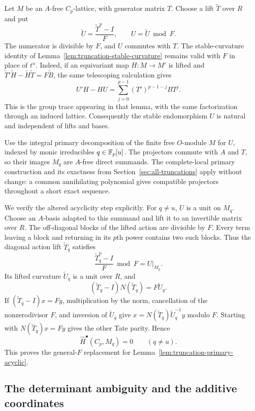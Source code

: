 Let $M$ be an $A$-free $C_p$-lattice, with generator matrix $T$.
Choose a lift $\widetilde T$ over $R$ and put
\[
 \widetilde U=\frac{\widetilde T^p-I}{F},\qquad
 U=\widetilde U\bmod F.
\]
The numerator is divisible by $F$, and $U$ commutes with $T$.
The stable-curvature identity of
Lemma~\ref{lem:truncation-stable-curvature} remains valid with $F$
in place of $t^n$.  Indeed, if an equivariant map $H:M\to M'$ is
lifted and
$\widetilde T'\widetilde H-\widetilde H\widetilde T=F\widetilde B$,
the same telescoping calculation gives
\begin{equation}\label{eq:monogenic-stable-curvature}
 U'H-HU=\sum_{j=0}^{p-1}(T')^{p-1-j}BT^j.
\end{equation}
This is the group trace appearing in that lemma, with the same
factorization through an induced lattice.  Consequently the stable
endomorphism $U$ is natural and independent of lifts and bases.

Use the integral primary decomposition of the finite free $O$-module
$M$ for $U$, indexed by monic irreducibles $q\in\mathbb F_p[u]$.
The projectors commute with $A$ and $T$, so their images $M_q$ are
$A$-free direct summands.  The complete-local primary construction and
its exactness from Section~\ref{sec:all-truncations} apply without
change: a common annihilating polynomial gives compatible projectors
throughout a short exact sequence.

We verify the altered acyclicity step explicitly.  For $q\ne u$,
$U$ is a unit on $M_q$.  Choose an $A$-basis adapted to this summand
and lift it to an invertible matrix over $R$.  The off-diagonal blocks
of the lifted action are divisible by $F$.  Every term leaving a
block and returning in its $p$th power contains two such blocks.
Thus the diagonal action lift $\widetilde T_q$ satisfies
\[
 \frac{\widetilde T_q^p-I}{F}\bmod F=U|_{M_q}.
\]
Its lifted curvature $\widetilde U_q$ is a unit over $R$, and
\begin{equation}\label{eq:monogenic-factorization}
 (\widetilde T_q-I)N(\widetilde T_q)=F\widetilde U_q.
\end{equation}
If $(\widetilde T_q-I)x=Fy$, multiplication by the norm, cancellation
of the nonzerodivisor $F$, and inversion of $\widetilde U_q$ give
$x=N(\widetilde T_q)\widetilde U_q^{-1}y$ modulo $F$.
Starting with $N(\widetilde T_q)x=Fy$ gives the other Tate parity.
Hence
\[
 \widehat H^\bullet(C_p,M_q)=0\qquad(q\ne u).
\]
This proves the general-$F$ replacement for
Lemma~\ref{lem:truncation-primary-acyclic}.

\subsection{The determinant ambiguity and the additive coordinates}

